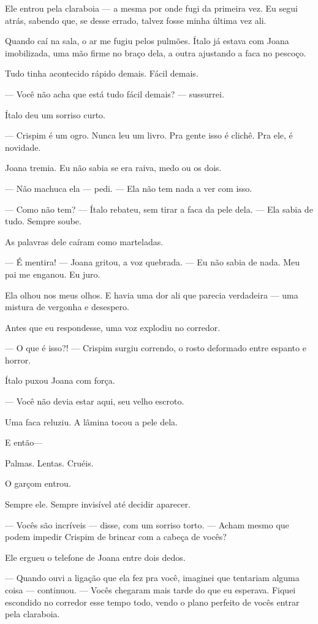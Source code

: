 Ele entrou pela claraboia — a mesma por onde fugi da primeira vez.  
Eu segui atrás, sabendo que, se desse errado, talvez fosse minha última vez ali.

Quando caí na sala, o ar me fugiu pelos pulmões.  
Ítalo já estava com Joana imobilizada, uma mão firme no braço dela, a outra ajustando a faca no pescoço.

Tudo tinha acontecido rápido demais. Fácil demais.

— Você não acha que está tudo fácil demais? — sussurrei.

Ítalo deu um sorriso curto.

— Crispim é um ogro. Nunca leu um livro. Pra gente isso é clichê. Pra ele, é novidade.

Joana tremia.  
Eu não sabia se era raiva, medo ou os dois.

— Não machuca ela — pedi. — Ela não tem nada a ver com isso.

— Como não tem? — Ítalo rebateu, sem tirar a faca da pele dela. — Ela sabia de tudo. Sempre soube.

As palavras dele caíram como marteladas.

— É mentira! — Joana gritou, a voz quebrada. — Eu não sabia de nada. Meu pai me enganou. Eu juro.

Ela olhou nos meus olhos.  
E havia uma dor ali que parecia verdadeira — uma mistura de vergonha e desespero.

Antes que eu respondesse, uma voz explodiu no corredor.

— O que é isso?! — Crispim surgiu correndo, o rosto deformado entre espanto e horror.

Ítalo puxou Joana com força.

— Você não devia estar aqui, seu velho escroto.

Uma faca reluziu. A lâmina tocou a pele dela.

E então—

Palmas.  
Lentas.  
Cruéis.

O garçom entrou.

Sempre ele.  
Sempre invisível até decidir aparecer.

— Vocês são incríveis — disse, com um sorriso torto. — Acham mesmo que podem impedir Crispim de brincar com a cabeça de vocês?

Ele ergueu o telefone de Joana entre dois dedos.

— Quando ouvi a ligação que ela fez pra você, imaginei que tentariam alguma coisa — continuou. — Vocês chegaram mais tarde do que eu esperava. Fiquei escondido no corredor esse tempo todo, vendo o plano perfeito de vocês entrar pela claraboia.

